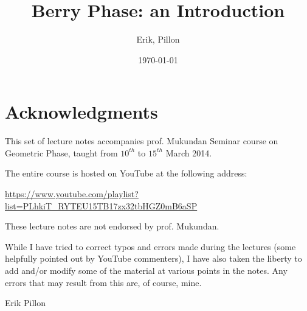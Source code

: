 \documentclass[12pt,parskip=half, DIV=calc, BCOR=10mm, x11names]{scrbook}
\title{Berry Phase: an Introduction}
\date{\today}
\author{Erik, Pillon}
\theoremstyle{remark}
\begin{document}
\maketitle
\frontmatter


\section*{Acknowledgments}
This set of lecture notes accompanies prof. Mukundan Seminar course on Geometric Phase, taught from $ 10^{th} $ to $ 15^{th} $ March 2014.

The entire course is hosted on YouTube at the following address:
\begin{center}
	\url{https://www.youtube.com/playlist?list=PLhkiT_RYTEU15TB17zx32tbHGZ0mB6aSP}
\end{center}
These lecture notes are not endorsed by prof. Mukundan.

While I have tried to correct typos and errors made during the lectures (some helpfully pointed out by YouTube commenters), I have also taken the liberty to add and/or modify some of the material at various points in the notes. Any errors that may result from this are, of course, mine.


\hfill {\ECFJD \Large Erik Pillon ~~~}
\tableofcontents

\mainmatter







%
%
%
\backmatter

%

\end{document}
